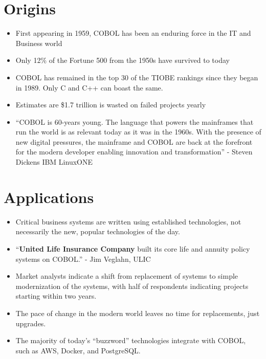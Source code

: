 \documentclass[12pt]{article}
\begin{document}
\section{Origins}

\begin{itemize}

    \item First appearing in 1959, COBOL has been an enduring force in the IT and Business world
    \item Only 12\% of the Fortune 500 from the 1950s have survived to today
    \item COBOL has remained in the top 30 of the TIOBE rankings since they began in 1989. Only C and C++ can boast the same.
    \item Estimates are \$1.7 trillion is wasted on failed projects yearly
    \item ``COBOL is 60-years young. The language that powers the mainframes that run the world is as relevant today as it was in the 1960s. With the presence of new digital pressures, the mainframe and COBOL are back at the forefront for the modern developer enabling innovation and transformation'' - Steven Dickens IBM LinuxONE

\end{itemize}



\section{Applications}

\begin{itemize}

    \item Critical business systems are written using established technologies, not necessarily the new, popular technologies of the day.
    \item ``\textbf{United Life Insurance Company} built its core life and annuity policy systems on COBOL.'' - Jim Veglahn, ULIC

    \item Market analysts indicate a shift from replacement of systems to simple modernization of the systems, with half of respondents indicating projects starting within two years.
    \item The pace of change in the modern world leaves no time for replacements, just upgrades.
    \item The majority of today's ``buzzword'' technologies integrate with COBOL, such as AWS, Docker, and PostgreSQL.

\end{itemize}
\end{document}
